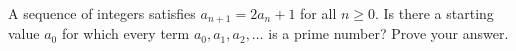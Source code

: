 A sequence of integers satisfies $a_{n+1}=2a_n+1$ for all $n\ge0$. Is there a starting value $a_0$ for which every term $a_0,a_1,a_2,\dots$ is a prime number? Prove your answer.
